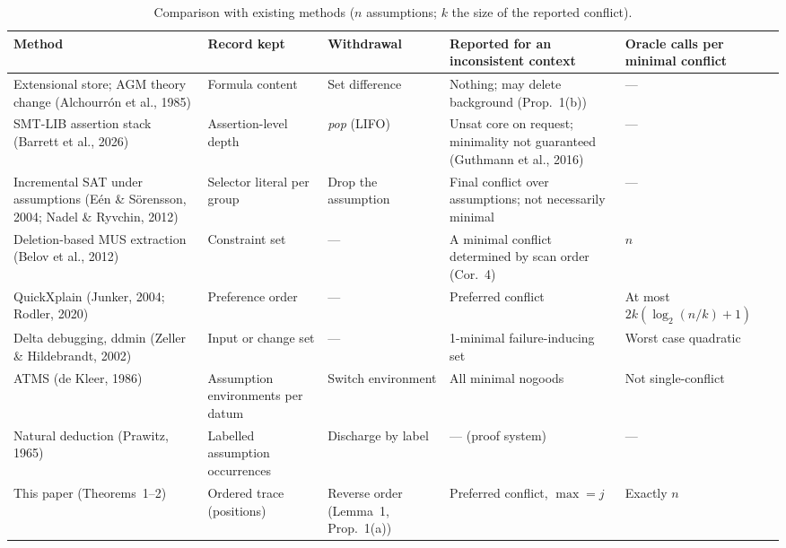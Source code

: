 \documentclass[11pt,reqno]{amsart}
\theoremstyle{plain}
\theoremstyle{definition}
\begin{document}
\begin{table}[t]
\centering
\caption{Comparison with existing methods ($n$ assumptions; $k$ the size of the
reported conflict).}
\small
\begin{tabular}{@{}p{3.1cm}p{2.1cm}p{1.9cm}p{3.5cm}p{2.4cm}@{}}
\toprule
\textbf{Method} & \textbf{Record kept} & \textbf{Withdrawal} &
\textbf{Reported for an inconsistent context} & \textbf{Oracle calls per minimal conflict}\\
\midrule
Extensional store; AGM theory change (Alchourr\'on et al., 1985) & Formula content & Set difference & Nothing; may delete background (Prop.~1(b)) & ---\\
SMT-LIB assertion stack (Barrett et al., 2026) & Assertion-level depth & \emph{pop} (LIFO) & Unsat core on request; minimality not guaranteed (Guthmann et al., 2016) & ---\\
Incremental SAT under assumptions (E\'en \& S\"orensson, 2004; Nadel \& Ryvchin, 2012) & Selector literal per group & Drop the assumption & Final conflict over assumptions; not necessarily minimal & ---\\
Deletion-based MUS extraction (Belov et al., 2012) & Constraint set & --- & A minimal conflict determined by scan order (Cor.~4) & $n$\\
QuickXplain (Junker, 2004; Rodler, 2020) & Preference order & --- & Preferred conflict & At most $2k(\log_2(n/k)+1)$\\
Delta debugging, ddmin (Zeller \& Hildebrandt, 2002) & Input or change set & --- & 1-minimal failure-inducing set & Worst case quadratic\\
ATMS (de Kleer, 1986) & Assumption environments per datum & Switch environment & All minimal nogoods & Not single-conflict\\
Natural deduction (Prawitz, 1965) & Labelled assumption occurrences & Discharge by label & --- (proof system) & ---\\
This paper (Theorems~1--2) & Ordered trace (positions) & Reverse order (Lemma~1, Prop.~1(a)) & Preferred conflict, $\max=j$ & Exactly $n$\\
\bottomrule
\end{tabular}
\end{table}
\end{document}
